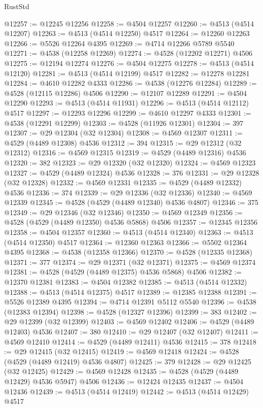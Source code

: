 \begin{lexlean}{RustStd}
\begin{coremodule}
@12257 := @12245 @12256
@12258 := @4504 @12257
@12260 := @4513 (@4514 @12207)
@12263 := @4513 (@4514 @12250) @4517
@12264 := @12260 @12263
@12266 := @5526 @12264 @4395
@12269 := @4714 @12266 @5789 @5540
@12271 := @4538 (@12258 @12269)
@12274 := @4528 (@12202 @12271) @4506
@12275 := @12194 @12274
@12276 := @4504 @12275
@12278 := @4513 (@4514 @12120)
@12281 := @4513 (@4514 @12199) @4517
@12282 := @12278 @12281
@12284 := @4610 @12282 @4333
@12286 := @4538 (@12276 @12284)
@12289 := @4528 (@12115 @12286) @4506
@12290 := @12107 @12289
@12291 := @4504 @12290
@12293 := @4513 (@4514 @11931)
@12296 := @4513 (@4514 @12112) @4517
@12297 := @12293 @12296
@12299 := @4610 @12297 @4333
@12301 := @4538 (@12291 @12299)
@12303 := @4528 (@11926 @12301)
@12304 := 397
@12307 := @29 @12304 (@32 @12304)
@12308 := @4569 @12307
@12311 := @4529 (@4489 @12308) @4536
@12312 := 394
@12315 := @29 @12312 (@32 @12312)
@12316 := @4569 @12315
@12319 := @4529 (@4489 @12316) @4536
@12320 := 382
@12323 := @29 @12320 (@32 @12320)
@12324 := @4569 @12323
@12327 := @4529 (@4489 @12324) @4536
@12328 := 376
@12331 := @29 @12328 (@32 @12328)
@12332 := @4569 @12331
@12335 := @4529 (@4489 @12332) @4536
@12336 := 374
@12339 := @29 @12336 (@32 @12336)
@12340 := @4569 @12339
@12345 := @4528 (@4529 (@4489 @12340) @4536 @4807)
@12346 := 375
@12349 := @29 @12346 (@32 @12346)
@12350 := @4569 @12349
@12356 := @4528 (@4529 (@4489 @12350) @4536 @5868) @4506
@12357 := @12345 @12356
@12358 := @4504 @12357
@12360 := @4513 (@4514 @12340)
@12363 := @4513 (@4514 @12350) @4517
@12364 := @12360 @12363
@12366 := @5502 @12364 @4395
@12368 := @4538 (@12358 @12366)
@12370 := @4528 (@12335 @12368)
@12371 := 377
@12374 := @29 @12371 (@32 @12371)
@12375 := @4569 @12374
@12381 := @4528 (@4529 (@4489 @12375) @4536 @5868) @4506
@12382 := @12370 @12381
@12383 := @4504 @12382
@12385 := @4513 (@4514 @12332)
@12388 := @4513 (@4514 @12375) @4517
@12389 := @12385 @12388
@12391 := @5526 @12389 @4395
@12394 := @4714 @12391 @5112 @5540
@12396 := @4538 (@12383 @12394)
@12398 := @4528 (@12327 @12396)
@12399 := 383
@12402 := @29 @12399 (@32 @12399)
@12403 := @4569 @12402
@12406 := @4529 (@4489 @12403) @4536
@12407 := 380
@12410 := @29 @12407 (@32 @12407)
@12411 := @4569 @12410
@12414 := @4529 (@4489 @12411) @4536
@12415 := 378
@12418 := @29 @12415 (@32 @12415)
@12419 := @4569 @12418
@12424 := @4528 (@4529 (@4489 @12419) @4536 @4807)
@12425 := 379
@12428 := @29 @12425 (@32 @12425)
@12429 := @4569 @12428
@12435 := @4528 (@4529 (@4489 @12429) @4536 @5947) @4506
@12436 := @12424 @12435
@12437 := @4504 @12436
@12439 := @4513 (@4514 @12419)
@12442 := @4513 (@4514 @12429) @4517

\end{coremodule}
\end{lexlean}
